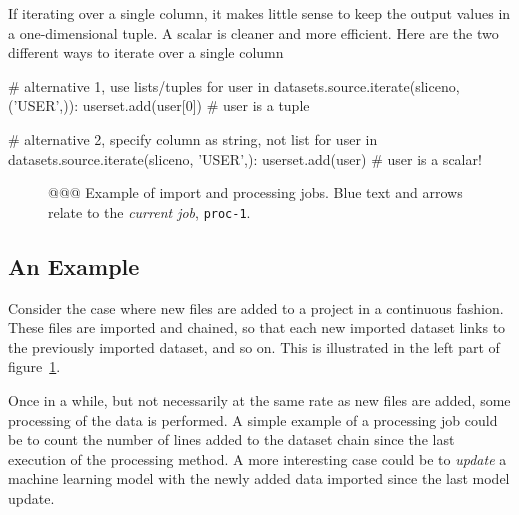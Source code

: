 If iterating over a single column, it makes little sense to keep the
output values in a one-dimensional tuple.  A scalar is cleaner and
more efficient.  Here are the two different ways to iterate over a
single column
\begin{python}
# alternative 1, use lists/tuples
for user in datasets.source.iterate(sliceno, ('USER',)):
    userset.add(user[0])  # user is a tuple

# alternative 2, specify column as string, not list
for user in datasets.source.iterate(sliceno, 'USER',):
    userset.add(user)     # user is a scalar!
\end{python}



\begin{figure}[t!]
  \begin{center}
    
    \caption{@@@  Example of import and processing jobs.  Blue text and arrows relate to the \textsl{current job}, \texttt{proc-1}.}
    \label{fig:dsprocchain}
  \end{center}
\end{figure}



\subsection*{An Example}
Consider the case where new files are added to a project in a
continuous fashion.  These files are imported and chained, so that
each new imported dataset links to the previously imported dataset,
and so on.  This is illustrated in the left part of
figure~\ref{fig:dsprocchain}.

Once in a while, but not necessarily at the same rate as new files are
added, some processing of the data is performed.  A simple example of
a processing job could be to count the number of lines added to the
dataset chain since the last execution of the processing method.  A
more interesting case could be to \textsl{update} a machine learning
model with the newly added data imported since the last model update.

